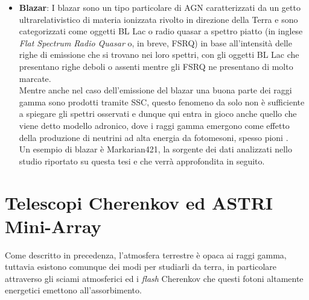 \documentclass[10pt]{article}
\begin{document}
\begin{itemize}
	Tuttavia, è importante notare come, nonostante il processo fondamentale sia lo stesso, l'emissione da parte dei quasar è differente da un GRB, infatti non solo lo spettro è diverso (con i quasar che emetto in un'ampio spettro di frequenze mentre i GRB sono dominati dai raggi gamma), ma anche la durata degli eventi ed il significato fisico dietro a questi fenomeni è sostanzialmente differente. Infatti i quasar sono sorgenti dall'emissione sostenuta, visibili per lunghi periodi di tempo e danno informazioni sulla dinamica delle galassie e sulle attività dei buchi neri, mentre i GBR sono eventi transienti che durano secondi o minuti e ci consentono di studiare l'evoluzione stellare ed il comportamento della materia sotto condizioni estreme.
	\item \textbf{Blazar}: I blazar sono un tipo particolare di AGN caratterizzati da un getto ultrarelativistico di materia ionizzata rivolto in direzione della Terra e sono categorizzati come oggetti BL Lac o radio quasar a spettro piatto (in inglese \textit{Flat Spectrum Radio Quasar} o, in breve, FSRQ) in base all'intensità delle righe di emissione che si trovano nei loro spettri, con gli oggetti BL Lac che presentano righe deboli o assenti mentre gli FSRQ ne presentano di molto marcate.\\
	Mentre anche nel caso dell'emissione del blazar una buona parte dei raggi gamma sono prodotti tramite SSC, questo fenomeno da solo non è sufficiente a spiegare gli spettri osservati e dunque qui entra in gioco anche quello che viene detto modello adronico, dove i raggi gamma emergono come effetto della produzione di neutrini ad alta energia da fotomesoni, spesso pioni \cite{UEMB}.\\
	Un esempio di blazar è Markarian421, la sorgente dei dati analizzati nello studio riportato su questa tesi e che verrà approfondita in seguito.
\end{itemize}

\newpage

\section{Telescopi Cherenkov ed ASTRI Mini-Array}

Come descritto in precedenza, l'atmosfera terrestre è opaca ai raggi gamma, tuttavia esistono comunque dei modi per studiarli da terra, in particolare attraverso gli sciami atmosferici ed i \textit{flash} Cherenkov che questi fotoni altamente energetici emettono all'assorbimento.
\end{document}
